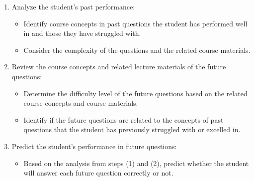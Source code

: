 \begin{enumerate}
    \item Analyze the student's past performance:
    \begin{itemize}
        \item Identify course concepts in past questions the student has performed well in and those they have struggled with.
        \item Consider the complexity of the questions and the related course materials.
    \end{itemize}
    \item Review the course concepts and related lecture materials of the future questions:
    \begin{itemize}
        \item Determine the difficulty level of the future questions based on the related course concepts and course materials.
        \item Identify if the future questions are related to the concepts of past questions that the student has previously struggled with or excelled in.
    \end{itemize}
    \item Predict the student's performance in future questions:
    \begin{itemize}
        \item Based on the analysis from steps (1) and (2), predict whether the student will answer each future question correctly or not.
    \end{itemize}
\end{enumerate}



